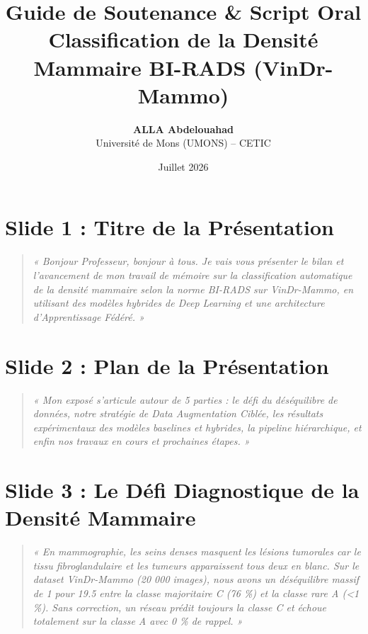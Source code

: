 \documentclass[11pt, a4paper]{article}
\title{\color{umonsRed}\Huge \textbf{Guide de Soutenance \& Script Oral}\\ \large Classification de la Densité Mammaire BI-RADS (VinDr-Mammo)}
\author{\textbf{ALLA Abdelouahad} \\ Université de Mons (UMONS) -- CETIC}
\date{Juillet 2026}
\begin{document}
\maketitle
\tableofcontents
\newpage

\section{Slide 1 : Titre de la Présentation}
\begin{quote}
    \textit{« Bonjour Professeur, bonjour à tous. Je vais vous présenter le bilan et l'avancement de mon travail de mémoire sur la classification automatique de la densité mammaire selon la norme BI-RADS sur VinDr-Mammo, en utilisant des modèles hybrides de Deep Learning et une architecture d'Apprentissage Fédéré. »}
\end{quote}

\section{Slide 2 : Plan de la Présentation}
\begin{quote}
    \textit{« Mon exposé s'articule autour de 5 parties : le défi du déséquilibre de données, notre stratégie de Data Augmentation Ciblée, les résultats expérimentaux des modèles baselines et hybrides, la pipeline hiérarchique, et enfin nos travaux en cours et prochaines étapes. »}
\end{quote}

\section{Slide 3 : Le Défi Diagnostique de la Densité Mammaire}
\begin{quote}
    \textit{« En mammographie, les seins denses masquent les lésions tumorales car le tissu fibroglandulaire et les tumeurs apparaissent tous deux en blanc. Sur le dataset VinDr-Mammo (20 000 images), nous avons un déséquilibre massif de 1 pour 19.5 entre la classe majoritaire C (76 \%) et la classe rare A (<1 \%). Sans correction, un réseau prédit toujours la classe C et échoue totalement sur la classe A avec 0 \% de rappel. »}
\end{quote}
\end{document}

